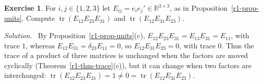 \documentclass[12pt]{article}
\newcommand{\R}{\mathbb R}
\DeclareMathOperator{\tr}{tr}
\theoremstyle{definition}
\newtheorem{exercise}{Exercise}
\newenvironment{solution}{\par\noindent\textit{Solution.}\ }{\par\smallskip}
\begin{document}
\begin{exercise}\label{r1-ex-trace-order}
For \(i,j\in\{1,2,3\}\) let \(E_{ij}=e_ie_j'\in\R^{3\times3}\), as in Proposition~\ref{r1-prop-units}. Compute
\(\tr(E_{12}E_{23}E_{31})\) and \(\tr(E_{12}E_{31}E_{23})\).
\end{exercise}
\begin{solution}
By Proposition~\ref{r1-prop-units}(c), \(E_{12}E_{23}E_{31}=E_{13}E_{31}=E_{11}\), with trace \(1\), whereas
\(E_{12}E_{31}=\delta_{23}E_{11}=0\), so \(E_{12}E_{31}E_{23}=0\), with trace \(0\). Thus the trace of a product
of three matrices is unchanged when the factors are moved cyclically (Theorem~\ref{r1-thm-trace}(c)), but it can
change when two factors are interchanged: \(\tr(E_{12}E_{23}E_{31})=1\ne0=\tr(E_{12}E_{31}E_{23})\).
\end{solution}
\end{document}
